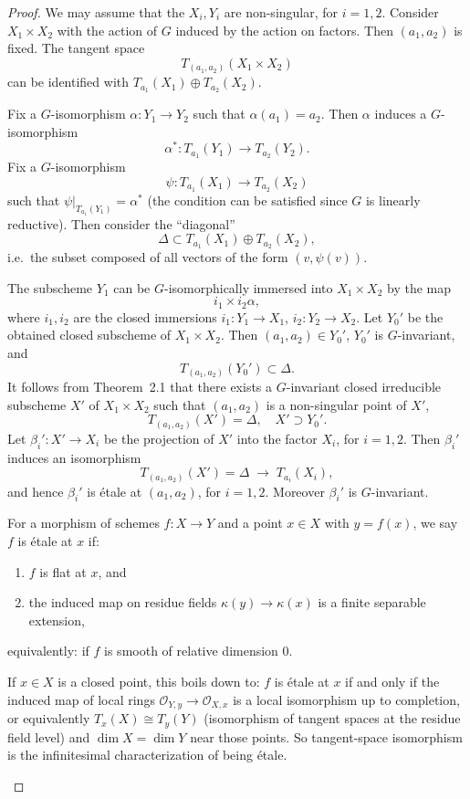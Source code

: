 \documentclass[12pt]{article}
\begin{document}
\begin{proof}
We may assume that the $X_i, Y_i$ are non-singular, for $i=1,2$.  
Consider $X_1 \times X_2$ with the action of $G$ induced by the action on factors.  
Then $(a_1,a_2)$ is fixed. The tangent space
\[
   T_{(a_1,a_2)}(X_1 \times X_2)
\]
can be identified with $T_{a_1}(X_1) \oplus T_{a_2}(X_2)$.  

Fix a $G$-isomorphism $\alpha : Y_1 \to Y_2$ such that $\alpha(a_1)=a_2$.  
Then $\alpha$ induces a $G$-isomorphism 
\[
   \alpha^* : T_{a_1}(Y_1) \to T_{a_2}(Y_2).
\]
Fix a $G$-isomorphism 
\[
   \psi : T_{a_1}(X_1) \to T_{a_2}(X_2)
\]
such that $\psi|_{T_{a_1}(Y_1)} = \alpha^*$ (the condition can be satisfied since $G$ is linearly reductive). Then consider the ``diagonal'' 
\[
   \Delta \subset T_{a_1}(X_1)\oplus T_{a_2}(X_2),
\]
i.e.\ the subset composed of all vectors of the form $(v,\psi(v))$.  

The subscheme $Y_1$ can be $G$-isomorphically immersed into $X_1 \times X_2$ by the map 
\[
   i_1 \times i_2 \alpha,
\]
where $i_1, i_2$ are the closed immersions $i_1 : Y_1 \to X_1$, $i_2 : Y_2 \to X_2$.  
Let $Y_0'$ be the obtained closed subscheme of $X_1 \times X_2$. Then $(a_1,a_2)\in Y_0'$, $Y_0'$ is $G$-invariant, and
\[
   T_{(a_1,a_2)}(Y_0') \subset \Delta.
\]
It follows from Theorem~2.1 that there exists a $G$-invariant closed irreducible subscheme $X'$ of $X_1 \times X_2$ such that $(a_1,a_2)$ is a non-singular point of $X'$, 
\[
   T_{(a_1,a_2)}(X') = \Delta, \quad X'\supset Y_0'.
\]
Let $\beta_i' : X' \to X_i$ be the projection of $X'$ into the factor $X_i$, for $i=1,2$.  
Then $\beta_i'$ induces an isomorphism 
\[
   T_{(a_1,a_2)}(X') = \Delta \;\to\; T_{a_i}(X_i),
\]
and hence $\beta_i'$ is \'etale at $(a_1,a_2)$, for $i=1,2$. Moreover $\beta_i'$ is $G$-invariant.  

\begin{remark}
    For a morphism of schemes $f: X \to Y$ and a point $x \in X$ with $y=f(x)$, we say $f$ is étale at $x$ if:
    \begin{enumerate}
        \item $f$ is flat at $x$, and
        \item the induced map on residue fields $\kappa(y) \to \kappa(x)$ is a finite separable extension,
    \end{enumerate}
    equivalently: if $f$ is smooth of relative dimension $0$.

    If $x \in X$ is a closed point, this boils down to: $f$ is étale at $x$ if and only if the induced map of local rings
    $\mathcal{O}_{Y,y} \to \mathcal{O}_{X,x}$
    is a local isomorphism up to completion, or equivalently
    $T_x(X) \cong T_y(Y)$
    (isomorphism of tangent spaces at the residue field level) and $\dim X = \dim Y$ near those points. So tangent-space isomorphism is the infinitesimal characterization of being étale.
\end{remark}


\end{proof}
\end{document}
